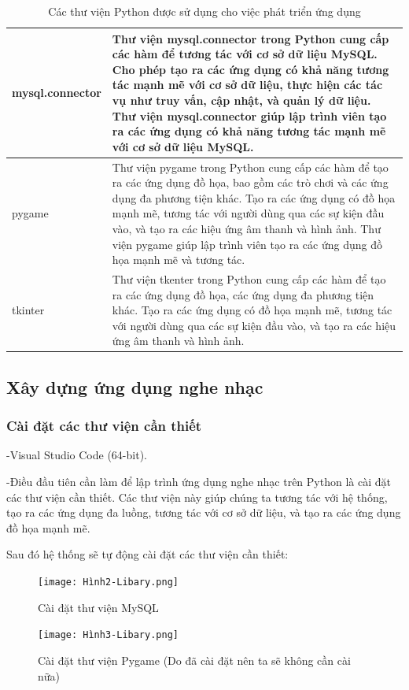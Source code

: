 \documentclass[a4paper]{article}
\begin{document}
\begin{table}[h]
\begin{tabular}{|l|p{10cm}|}
		\hline
		mysql.connector   & Thư viện mysql.connector trong Python cung cấp các hàm để tương tác với cơ sở dữ liệu MySQL. Cho phép tạo ra các ứng dụng có khả năng tương tác mạnh mẽ với cơ sở dữ liệu, thực hiện các tác vụ như truy vấn, cập nhật, và quản lý dữ liệu. Thư viện mysql.connector giúp lập trình viên tạo ra các ứng dụng có khả năng tương tác mạnh mẽ với cơ sở dữ liệu MySQL.                                                                                                       \\
		\hline
		pygame            & Thư viện pygame trong Python cung cấp các hàm để tạo ra các ứng dụng đồ họa, bao gồm các trò chơi và các ứng dụng đa phương tiện khác. Tạo ra các ứng dụng có đồ họa mạnh mẽ, tương tác với người dùng qua các sự kiện đầu vào, và tạo ra các hiệu ứng âm thanh và hình ảnh. Thư viện pygame giúp lập trình viên tạo ra các ứng dụng đồ họa mạnh mẽ và tương tác.                                                                                                         \\
		\hline
		tkinter           & Thư viện tkenter trong Python cung cấp các hàm để tạo ra các ứng dụng đồ họa, các ứng dụng đa phương tiện khác. Tạo ra các ứng dụng có đồ họa mạnh mẽ, tương tác với người dùng qua các sự kiện đầu vào, và tạo ra các hiệu ứng âm thanh và hình ảnh.                                                                                                                                                                                                                     \\
		\hline
	\end{tabular}
	\caption{Các thư viện Python được sử dụng cho việc phát triển ứng dụng}
	\label{tab:my_label}
\end{table}
\clearpage
\newpage
\subsection{Xây dựng ứng dụng nghe nhạc}
\subsubsection{Cài đặt các thư viện cần thiết}
\begin{flushleft}
	-Visual Studio Code (64-bit).

	-Điều đầu tiên cần làm để lập trình ứng dụng nghe nhạc trên Python là cài đặt các thư viện cần thiết.
	Các thư viện này giúp chúng ta tương tác với hệ thống, tạo ra các ứng dụng đa luồng,
	tương tác với cơ sở dữ liệu, và tạo ra các ứng dụng đồ họa mạnh mẽ.

	Sau đó hệ thống sẽ tự động cài đặt các thư viện cần thiết:
	\begin{figure}[h]
		\centering
		\texttt{[image: Hình2-Libary.png]}
		\caption{Cài đặt thư viện MySQL}
	\end{figure}
	\begin{figure}[h]
		\centering
		\texttt{[image: Hình3-Libary.png]}
		\caption{Cài đặt thư viện Pygame (Do đã cài đặt nên ta sẽ không cần cài nữa)}
	\end{figure}
\end{flushleft}
\end{document}
